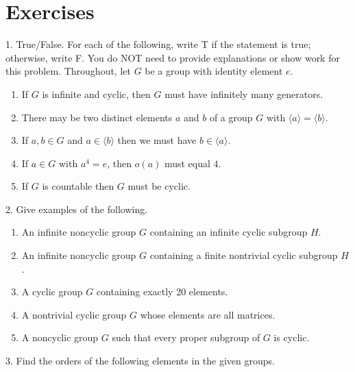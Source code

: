 \documentclass[10pt,openany,oneside]{book}
\theoremstyle{plain}
\theoremstyle{definition}
\theoremstyle{definition}
\theoremstyle{definition}
\theoremstyle{definition}
\numberwithin{equation}{section}
\begin{document}
\section[{Exercises}]{Exercises}\label{exercises-6}
\begin{exerciselist}
\item[1.]\hypertarget{exercise-34}{}True/False. For each of the following, write T if the statement is true; otherwise, write F. You do NOT need to provide explanations or show work for this problem. Throughout, let \(G\) be a group with identity element \(e\). \leavevmode%
\begin{enumerate}[label=(\alph*)]
\item\hypertarget{li-267}{}If \(G\) is infinite and cyclic, then \(G\) must have infinitely many generators.%
\item\hypertarget{li-268}{}There may be two distinct elements \(a\) and \(b\) of a group \(G\) with \(\langle a\rangle =\langle b\rangle\).%
\item\hypertarget{li-269}{}If \(a,b\in G\) and \(a\in \langle b\rangle\) then we must have \(b\in \langle a\rangle\).%
\item\hypertarget{li-270}{}If \(a\in G\) with \(a^4=e\), then \(o(a)\) must equal \(4\).%
\item\hypertarget{li-271}{}If \(G\) is countable then \(G\) must be cyclic.%
\end{enumerate}
%
\par\smallskip
\item[2.]\hypertarget{exercise-35}{}Give examples of the following. \leavevmode%
\begin{enumerate}[label=(\alph*)]
\item\hypertarget{li-277}{}An infinite noncyclic group \(G\) containing an infinite cyclic subgroup \(H\).%
\item\hypertarget{li-278}{}An infinite noncyclic group \(G\) containing a finite nontrivial cyclic subgroup \(H\).%
\item\hypertarget{li-279}{}A cyclic group \(G\) containing exactly 20 elements.%
\item\hypertarget{li-280}{}A nontrivial cyclic group \(G\) whose elements are all matrices.%
\item\hypertarget{li-281}{}A noncyclic group \(G\) such that every proper subgroup of \(G\) is cyclic.%
\end{enumerate}
%
\par\smallskip
\item[3.]\hypertarget{exercise-36}{}Find the orders of the following elements in the given groups. \leavevmode%

\end{exerciselist}
\end{document}
